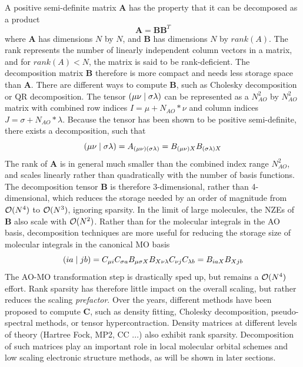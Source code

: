 A positive semi-definite matrix $\mathbf{A}$ has the property that it can be decomposed as a product 
\begin{equation}
\mathbf{A} = \mathbf{B} \mathbf{B}^T
\end{equation}
\noindent where $\mathbf{A}$ has dimensions $N$ by $N$, and $\mathbf{B}$ has dimensions $N$ by $rank(A)$. The rank represents the number of linearly independent column vectors in a matrix, and for $rank(A) < N$, the matrix is said to  be rank-deficient. The decomposition matrix $\mathbf{B}$ therefore is more compact and needs less storage space than $\mathbf{A}$. There are different ways to compute $\mathbf{B}$, such as Cholesky decomposition or QR decomposition.
The tensor $\left( \mu\nu \mid \sigma\lambda \right)$ can be represented as a $N_{AO}^2$
by $N_{AO}^2$ matrix with combined row indices $I = \mu + N_{AO}*\nu$ and column indices $J = \sigma + N_{AO}*\lambda$. Because the tensor has been shown to be positive semi-definite, there exists a decomposition, such that
\begin{equation}
\left( \mu\nu \mid \sigma\lambda \right) = A_{(\mu\nu)(\sigma\lambda)} = B_{(\mu\nu)X} B_{(\sigma\lambda)X}
\end{equation}
\noindent The rank of $\mathbf{A}$ is in general much smaller than the combined index range $N_{AO}^2$, and scales linearly rather than quadratically with the number of basis functions. The decomposition tensor $\mathbf{B}$ is therefore 3-dimensional, rather than 4-dimensional, which reduces the storage needed by an order of magnitude from $\mathcal{O}(N^{4})$ to $\mathcal{O}(N^{3})$, ignoring sparsity. In the limit of large molecules, the NZEs of $\mathbf{B}$ also scale with $\mathcal{O}(N^{2})$. Rather than for the molecular integrals in the AO basis, decomposition techniques are more useful for reducing the storage size of molecular integrals in the canonical MO basis
\begin{equation}
\left( ia \mid jb \right) = C_{\mu i} C_{\sigma a} B_{\mu \sigma X} B_{X \nu \lambda} C_{\nu j} C_{\lambda b} = B_{iaX} B_{Xjb}
\end{equation} 
\noindent The AO-MO transformation step is drastically sped up, but remains a $\mathcal{O}(N^{4})$ effort. Rank sparsity has therefore little impact on the overall scaling, but rather reduces the scaling \emph{prefactor}. Over the years, different methods have been proposed to compute $\mathbf{C}$, such as density fitting, Cholesky decomposition, pseudo-spectral methods, or tensor hypercontraction.
Density matrices at different levels of theory (Hartree Fock, MP2, CC ...) also exhibit rank sparsity. Decomposition of such matrices play an important role in local molecular orbital schemes and low scaling electronic structure methods, as will be shown in later sections.

